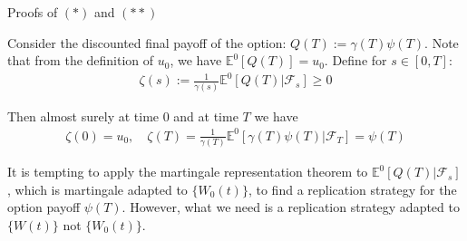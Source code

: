 \documentclass{beamer}
\begin{document}
\begin{frame}{Proofs of $(*)$ and $(**)$}

    {\footnotesize \footnotesize
    \par Consider the discounted final payoff of the option: $ Q(T) := \gamma(T)\psi(T)$. Note that from 
    the definition of $u_0$, we have $\mathbb{E}^0[Q(T)] = u_0$. Define for $s \in [0, T]$:
    \begin{align*}
        \zeta(s) := \frac{1}{\gamma(s)}\mathbb{E}^0[Q(T) | \mathcal{F}_s] \geq 0
    \end{align*}
    \par Then almost surely at time 0 and at time $T$ we have
    \begin{align*}
        \zeta(0) = u_0, \quad \zeta(T) = \frac{1}{\gamma(T)}\mathbb{E}^0[\gamma(T)\psi(T) | \mathcal{F}_T] = \psi(T)
    \end{align*}
    \par It is tempting to apply the martingale representation theorem to $\mathbb{E}^0[Q(T) | \mathcal{F}_s]$, 
    which is martingale adapted to $\{W_0(t)\}$, to find a replication strategy for the option payoff $\psi(T)$.
     However, what we need is a replication strategy adapted to $\{W(t)\}$ not $\{W_0(t)\}$.
    }

\end{frame}
\end{document}
